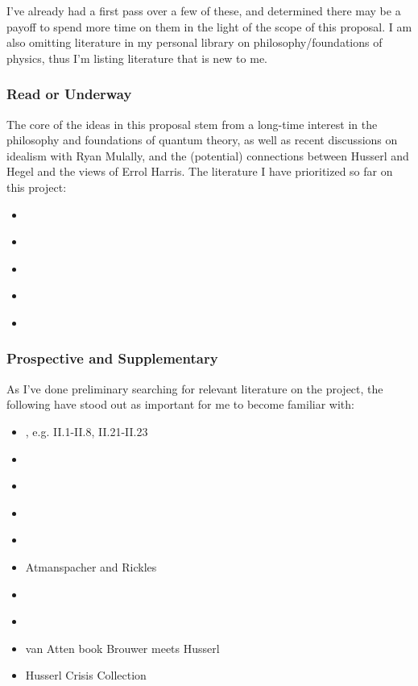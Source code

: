 \documentclass{article}
\begin{document}
I've already had a first pass over a few of these, and determined there may be a payoff to spend more time on them in the light of the scope of this proposal.  I am also omitting literature in my personal library on philosophy/foundations of physics, thus I'm listing literature that is new to me. 

\subsubsection{Read or Underway}

The core of the ideas in this proposal stem from a long-time interest in the philosophy and foundations of quantum theory, as well as recent discussions on idealism with Ryan Mulally, and the (potential) connections between Husserl and Hegel and the views of Errol Harris.  The literature I have prioritized so far on this project:

\begin{itemize}
    \item \cite{Poincare1952}
    \item \cite{Eddington1939}
    \item \cite{Ryckman2005}
    \item \cite{Harris1965}
    \item \cite{Weyl1949}
\end{itemize}


\subsubsection{Prospective and Supplementary}

As I've done preliminary searching for relevant literature on the project, the following have stood out as important for me to become familiar with:

\begin{itemize}
    \item \cite{SchilppCassirer}, e.g. II.1-II.8, II.21-II.23
    \item \cite{Adorno1940}
    \item \cite{Clifford1878}
    \item \cite{Ewing1934}
    \item \cite{Kilmister1994}
    \item Atmanspacher and Rickles
    \item \cite{Cartwright1983}
    \item \cite{Torretti1999}
    \item van Atten book Brouwer meets Husserl
    \item Husserl Crisis Collection



\end{itemize}
\end{document}
